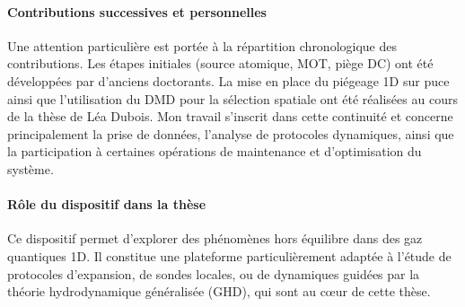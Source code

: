 \paragraph{Contributions successives et personnelles}  
Une attention particulière est portée à la répartition chronologique des contributions. Les étapes initiales (source atomique, MOT, piège DC) ont été développées par d’anciens doctorants. La mise en place du piégeage 1D sur puce ainsi que l’utilisation du DMD pour la sélection spatiale ont été réalisées au cours de la thèse de Léa Dubois. Mon travail s’inscrit dans cette continuité et concerne principalement la prise de données, l’analyse de protocoles dynamiques, ainsi que la participation à certaines opérations de maintenance et d’optimisation du système.

\paragraph{Rôle du dispositif dans la thèse}  
Ce dispositif permet d’explorer des phénomènes hors équilibre dans des gaz quantiques 1D. Il constitue une plateforme particulièrement adaptée à l’étude de protocoles d’expansion, de sondes locales, ou de dynamiques guidées par la théorie hydrodynamique généralisée (GHD), qui sont au cœur de cette thèse.




%

